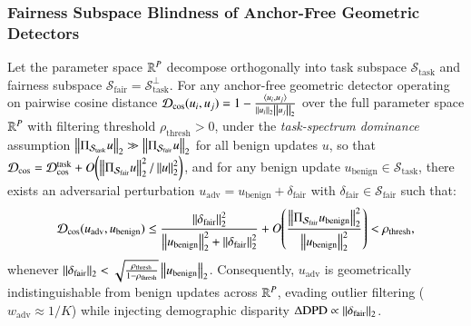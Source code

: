 \subsubsection{Fairness Subspace Blindness of Anchor-Free Geometric Detectors}
\label{subsubsec:theory_subspace}
\begin{theorem}
\label{thm:subspace_blindness}
Let the parameter space $\mathbb{R}^P$ decompose orthogonally into task subspace $\mathcal{S}_{\mathrm{task}}$ and fairness subspace $\mathcal{S}_{\mathrm{fair}} = \mathcal{S}_{\mathrm{task}}^\perp$. For any anchor-free geometric detector operating on pairwise cosine distance $\mathcal{D}_{\mathrm{cos}}(u_i, u_j) = 1 - \frac{\langle u_i, u_j \rangle}{\left\lVert u_i \right\rVert_2 \left\lVert u_j \right\rVert_2}$ over the full parameter space $\mathbb{R}^P$ with filtering threshold $\rho_{\mathrm{thresh}} > 0$, under the \emph{task-spectrum dominance} assumption $\left\lVert \Pi_{\mathcal{S}_{\mathrm{task}}} u \right\rVert_2 \gg \left\lVert \Pi_{\mathcal{S}_{\mathrm{fair}}} u \right\rVert_2$ for all benign updates $u$, so that $\mathcal{D}_{\mathrm{cos}} = \mathcal{D}_{\mathrm{cos}}^{\mathrm{task}} + O\!\left( \left\lVert \Pi_{\mathcal{S}_{\mathrm{fair}}} u \right\rVert_2^2 / \left\lVert u \right\rVert_2^2 \right)$, and for any benign update $u_{\mathrm{benign}} \in \mathcal{S}_{\mathrm{task}}$, there exists an adversarial perturbation $u_{\mathrm{adv}} = u_{\mathrm{benign}} + \delta_{\mathrm{fair}}$ with $\delta_{\mathrm{fair}} \in \mathcal{S}_{\mathrm{fair}}$ such that:
\begin{equation}
\label{eq:blindness_dist}
\mathcal{D}_{\mathrm{cos}}(u_{\mathrm{adv}}, u_{\mathrm{benign}}) \le \frac{\left\lVert \delta_{\mathrm{fair}} \right\rVert_2^2}{\left\lVert u_{\mathrm{benign}} \right\rVert_2^2 + \left\lVert \delta_{\mathrm{fair}} \right\rVert_2^2} + O\!\left( \frac{\left\lVert \Pi_{\mathcal{S}_{\mathrm{fair}}} u_{\mathrm{benign}} \right\rVert_2^2}{\left\lVert u_{\mathrm{benign}} \right\rVert_2^2} \right) < \rho_{\mathrm{thresh}},
\end{equation}
whenever $\left\lVert \delta_{\mathrm{fair}} \right\rVert_2 < \sqrt{\frac{\rho_{\mathrm{thresh}}}{1 - \rho_{\mathrm{thresh}}}} \left\lVert u_{\mathrm{benign}} \right\rVert_2$. Consequently, $u_{\mathrm{adv}}$ is geometrically indistinguishable from benign updates across $\mathbb{R}^P$, evading outlier filtering ($w_{\mathrm{adv}} \approx 1/K$) while injecting demographic disparity $\Delta \mathrm{DPD} \propto \left\lVert \delta_{\mathrm{fair}} \right\rVert_2$.
\end{theorem}
